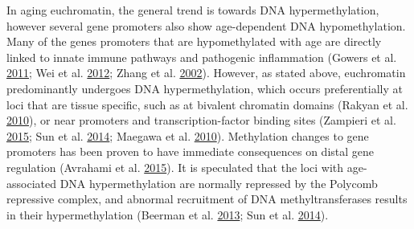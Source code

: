 \documentclass[onehalf,12pt]{beavtex}
\begin{document}
  In aging euchromatin, the general trend is towards DNA hypermethylation,
  however several gene promoters also show age-dependent DNA
  hypomethylation. Many of the genes promoters that are hypomethylated
  with age are directly linked to innate immune pathways and pathogenic
  inflammation (Gowers et al.
  \protect\hyperlink{ref-GowersAgerelatedlossCpG2011}{2011}; Wei et al.
  \protect\hyperlink{ref-WeiHypomethylationIL17RCpromoter2012}{2012};
  Zhang et al.
  \protect\hyperlink{ref-ZhangAgedependentDNAmethylation2002}{2002}).
  However, as stated above, euchromatin predominantly undergoes DNA
  hypermethylation, which occurs preferentially at loci that are tissue
  specific, such as at bivalent chromatin domains (Rakyan et al.
  \protect\hyperlink{ref-RakyanHumanagingassociatedDNA2010}{2010}), or
  near promoters and transcription-factor binding sites (Zampieri et al.
  \protect\hyperlink{ref-ZampieriReconfigurationDNAmethylation2015}{2015};
  Sun et al.
  \protect\hyperlink{ref-SunEpigenomicprofilingyoung2014}{2014}; Maegawa
  et al.
  \protect\hyperlink{ref-MaegawaWidespreadtissuespecific2010}{2010}).
  Methylation changes to gene promoters has been proven to have immediate
  consequences on distal gene regulation (Avrahami et al.
  \protect\hyperlink{ref-AvrahamiAgingdependentdemethylationregulatory2015}{2015}).
  It is speculated that the loci with age-associated DNA hypermethylation
  are normally repressed by the Polycomb repressive complex, and abnormal
  recruitment of DNA methyltransferases results in their hypermethylation
  (Beerman et al.
  \protect\hyperlink{ref-BeermanProliferationdependentalterationsDNA2013}{2013};
  Sun et al.
  \protect\hyperlink{ref-SunEpigenomicprofilingyoung2014}{2014}).
  
\end{document}
